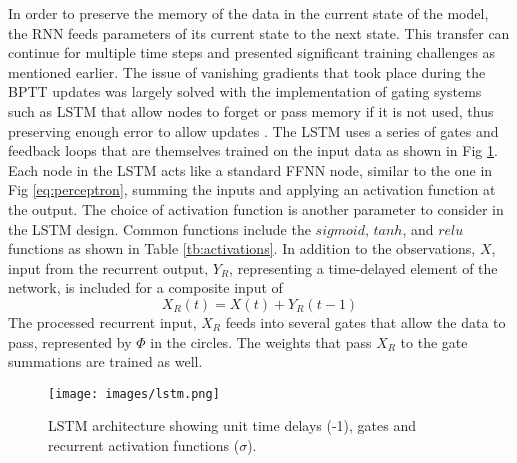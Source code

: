 In order to preserve the memory of the data in the current state of the model, the RNN feeds parameters of its current state to the next state. This transfer can continue for multiple time steps and presented significant training challenges as mentioned earlier. The issue of vanishing gradients that took place during the BPTT updates was largely solved with the implementation of gating systems such as LSTM that allow nodes to forget or pass memory if it is not used, thus preserving enough error to allow updates \citep{Hochreiter1997}. The LSTM uses a series of gates and feedback loops that are themselves trained on the input data as shown in Fig \ref{fig:lstm}. Each node in the LSTM acts like a standard FFNN node, similar to the one in Fig \ref{eq:perceptron}, summing the inputs and applying an activation function at the output. The choice of activation function is another parameter to consider in the LSTM design. Common functions include the $sigmoid$, $tanh$, and $relu$ functions as shown in Table \ref{tb:activations}. In addition to the observations, $X$, input from the recurrent output, $Y_{R}$, representing a time-delayed element of the network, is included for a composite input of 
%
\begin{equation}
\label{eq:Xr}
X_{R}(t) = X(t) + Y_{R}(t-1)
\end{equation}
%
The processed recurrent input, $X_{R}$ feeds into several gates that allow the data to pass, represented by $\Phi$ in the circles. The weights that pass $X_{R}$ to the gate summations are trained as well.
%
\begin{figure}[H]
\centering
\texttt{[image: images/lstm.png]} 
\caption[LSTM architecture]{LSTM architecture showing unit time delays (-1), gates and recurrent activation functions ($\sigma$).}
\label{fig:lstm}
\end{figure}
%